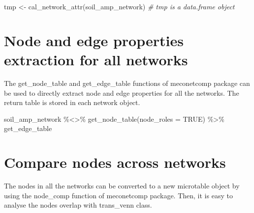 \documentclass[
]{book}
\newenvironment{Shaded}{\begin{snugshade}}{\end{snugshade}}
\newcommand{\AttributeTok}[1]{\textcolor[rgb]{0.77,0.63,0.00}{#1}}
\newcommand{\CommentTok}[1]{\textcolor[rgb]{0.56,0.35,0.01}{\textit{#1}}}
\newcommand{\ConstantTok}[1]{\textcolor[rgb]{0.00,0.00,0.00}{#1}}
\newcommand{\FunctionTok}[1]{\textcolor[rgb]{0.00,0.00,0.00}{#1}}
\newcommand{\NormalTok}[1]{#1}
\newcommand{\OtherTok}[1]{\textcolor[rgb]{0.56,0.35,0.01}{#1}}
\newcommand{\SpecialCharTok}[1]{\textcolor[rgb]{0.00,0.00,0.00}{#1}}
\begin{document}
\begin{Shaded}
\begin{Highlighting}[]
\NormalTok{tmp }\OtherTok{\textless{}{-}} \FunctionTok{cal\_network\_attr}\NormalTok{(soil\_amp\_network)}
\CommentTok{\# tmp is a data.frame object}
\end{Highlighting}
\end{Shaded}

\hypertarget{node-and-edge-properties-extraction-for-all-networks}{%
\section{Node and edge properties extraction for all networks}\label{node-and-edge-properties-extraction-for-all-networks}}

The get\_node\_table and get\_edge\_table functions of meconetcomp package can be used to directly extract node and edge properties for all the networks.
The return table is stored in each network object.

\begin{Shaded}
\begin{Highlighting}[]
\NormalTok{soil\_amp\_network }\SpecialCharTok{\%\textless{}\textgreater{}\%} \FunctionTok{get\_node\_table}\NormalTok{(}\AttributeTok{node\_roles =} \ConstantTok{TRUE}\NormalTok{) }\SpecialCharTok{\%\textgreater{}\%}\NormalTok{ get\_edge\_table}
\end{Highlighting}
\end{Shaded}

\hypertarget{compare-nodes-across-networks}{%
\section{Compare nodes across networks}\label{compare-nodes-across-networks}}

The nodes in all the networks can be converted to a new microtable object by using the node\_comp function of meconetcomp package.
Then, it is easy to analyse the nodes overlap with trans\_venn class.
\end{document}
